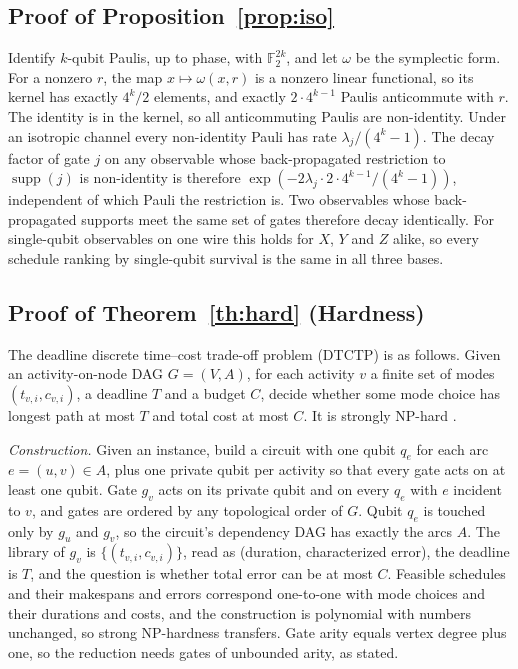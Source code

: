 \documentclass[10pt,letterpaper,journal]{IEEEtran}
\begin{document}
\subsection{Proof of Proposition~\ref{prop:iso}}
Identify $k$-qubit Paulis, up to phase, with $\mathbb F_2^{2k}$, and let $\omega$ be the symplectic form. For a nonzero $r$, the map $x\mapsto\omega(x,r)$ is a nonzero linear functional, so its kernel has exactly $4^k/2$ elements, and exactly $2\cdot4^{k-1}$ Paulis anticommute with $r$. The identity is in the kernel, so all anticommuting Paulis are non-identity. Under an isotropic channel every non-identity Pauli has rate $\lambda_j/(4^k-1)$. The decay factor of gate $j$ on any observable whose back-propagated restriction to $\operatorname{supp}(j)$ is non-identity is therefore $\exp(-2\lambda_j\cdot2\cdot4^{k-1}/(4^k-1))$, independent of which Pauli the restriction is. Two observables whose back-propagated supports meet the same set of gates therefore decay identically. For single-qubit observables on one wire this holds for $X$, $Y$ and $Z$ alike, so every schedule ranking by single-qubit survival is the same in all three bases.

\subsection{Proof of Theorem~\ref{th:hard} (Hardness)}
The deadline discrete time--cost trade-off problem (DTCTP) is as follows. Given an activity-on-node DAG $G=(V,A)$, for each activity $v$ a finite set of modes $(t_{v,i},c_{v,i})$, a deadline $T$ and a budget $C$, decide whether some mode choice has longest path at most $T$ and total cost at most $C$. It is strongly NP-hard \cite{de1997}.

\emph{Construction.} Given an instance, build a circuit with one qubit $q_e$ for each arc $e=(u,v)\in A$, plus one private qubit per activity so that every gate acts on at least one qubit. Gate $g_v$ acts on its private qubit and on every $q_e$ with $e$ incident to $v$, and gates are ordered by any topological order of $G$. Qubit $q_e$ is touched only by $g_u$ and $g_v$, so the circuit's dependency DAG has exactly the arcs $A$. The library of $g_v$ is $\{(t_{v,i},c_{v,i})\}$, read as (duration, characterized error), the deadline is $T$, and the question is whether total error can be at most $C$. Feasible schedules and their makespans and errors correspond one-to-one with mode choices and their durations and costs, and the construction is polynomial with numbers unchanged, so strong NP-hardness transfers. Gate arity equals vertex degree plus one, so the reduction needs gates of unbounded arity, as stated.
\end{document}

